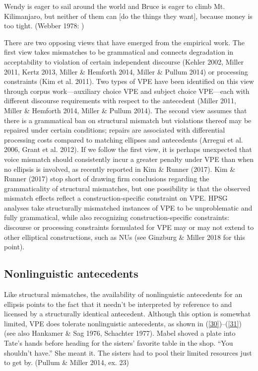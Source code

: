 \documentclass[output=paper]{langsci/langscibook}
\begin{document}
{\ea Wendy is eager to sail around the world and Bruce is eager to climb Mt. Kilimanjaro, but neither of them can [do the things they want], because money is too tight. (Webber 1978: )\label{29}\z

There are two opposing views that have emerged from the empirical work. The first view takes mismatches to be grammatical and connects degradation in acceptability to violation of certain independent discourse (Kehler 2002, Miller 2011, Kertz 2013, Miller \& Hemforth 2014, Miller \& Pullum 2014) or processing constraints (Kim et al. 2011). Two types of VPE have been identified on this view through corpus work---auxiliary choice VPE and subject choice VPE---each with different discourse requirements with respect to the antecedent (Miller 2011, Miller \& Hemforth 2014, Miller \& Pullum 2014). The second view assumes that there is a grammatical ban on structural mismatch but violations thereof may be repaired under certain conditions; repairs are associated with differential processing costs compared to matching ellipses and antecedents (Arregui et al. 2006, Grant et al. 2012). If we follow the first view, it is perhaps unexpected that voice mismatch should consistently incur a greater penalty under VPE than when no ellipsis is involved, as recently reported in Kim \& Runner (2017). Kim \& Runner (2017) stop short of drawing firm conclusions regarding the grammaticality of structural mismatches, but one possibility is that the observed mismatch effects reflect a construction-specific constraint on VPE. HPSG analyses take structurally mismatched instances of VPE to be unproblematic and fully grammatical, while also recognizing construction-specific constraints: discourse or processing constraints formulated for VPE may or may not extend to other elliptical constructions, such as NUs (see Ginzburg \& Miller 2018 for this point).


\subsection{Nonlinguistic antecedents}
Like structural mismatches, the availability of nonlinguistic antecedents for an ellipsis points to the fact that it needn't be interpreted by reference to and licensed by a structurally identical antecedent. Although this option is somewhat limited, VPE does tolerate nonlinguistic antecedents, as shown in (\ref{30})--(\ref{31}) (see also Hankamer \& Sag 1976, Schachter 1977).
\ea Mabel shoved a plate into Tate's hands before heading for the sisters' favorite table in the shop. ``You shouldn't have.'' She meant it. The sisters had to pool their limited resources
just to get by. (Pullum \& Miller 2014, ex. 23)\label{30}\z

}
\end{document}
